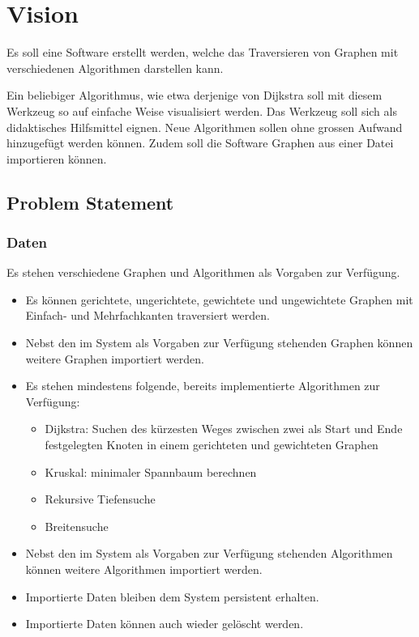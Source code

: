 \section{Vision}
\label{sec:Vision}
Es soll eine Software erstellt werden, welche das Traversieren von Graphen mit verschiedenen Algorithmen darstellen kann. 

Ein beliebiger Algorithmus, wie etwa derjenige von Dijkstra soll mit diesem Werkzeug so auf einfache Weise visualisiert werden. Das Werkzeug soll sich als didaktisches Hilfsmittel eignen. Neue Algorithmen sollen ohne grossen Aufwand hinzugef\"ugt werden k\"onnen. Zudem soll die Software Graphen aus einer Datei importieren k\"onnen.
% 
\subsection{Problem Statement}	
\label{subsec:Problem Statement}
% 
\subsubsection{Daten}
\label{subsubsec:Daten}
Es stehen verschiedene Graphen und Algorithmen als Vorgaben zur Verf\"ugung.
\begin{itemize}
    \item Es k\"onnen gerichtete, ungerichtete, gewichtete und ungewichtete Graphen mit Einfach- und Mehrfachkanten traversiert werden.  
    \item Nebst den im System als Vorgaben zur Verf\"ugung stehenden Graphen k\"onnen weitere Graphen importiert werden.
    \item Es stehen mindestens folgende, bereits implementierte Algorithmen zur Verf\"ugung:
  \begin{itemize}
    \item Dijkstra: Suchen des k\"urzesten Weges zwischen zwei als Start und Ende festgelegten Knoten in einem gerichteten und gewichteten Graphen
    \item Kruskal: minimaler Spannbaum berechnen
    \item Rekursive Tiefensuche
    \item Breitensuche
  \end{itemize}
  \item Nebst den im System als Vorgaben zur Verf\"ugung stehenden Algorithmen k\"onnen weitere Algorithmen importiert werden.
  \item Importierte Daten bleiben dem System persistent erhalten.
  \item Importierte Daten k\"onnen auch wieder gel\"oscht werden.
\end{itemize}
% 
